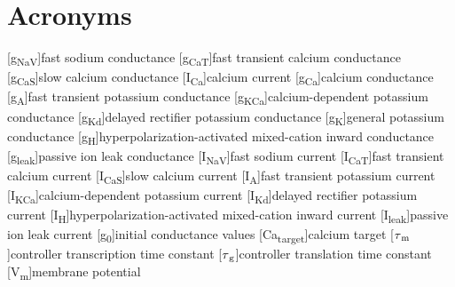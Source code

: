     \chapter*{Acronyms}
    \begin{acronym}[UMLX]
        [g\textsubscript{NaV}]{fast sodium conductance}
    	[g\textsubscript{CaT}]{fast transient calcium conductance}
    	[g\textsubscript{CaS}]{slow calcium conductance}
    	[I\textsubscript{Ca}]{calcium current}
    	[g\textsubscript{Ca}]{calcium conductance}
    	[g\textsubscript{A}]{fast transient potassium conductance}
    	[g\textsubscript{KCa}]{calcium-dependent potassium conductance}
    	[g\textsubscript{Kd}]{delayed rectifier potassium conductance}
    	[g\textsubscript{K}]{general potassium conductance}
    	[g\textsubscript{H}]{hyperpolarization-activated mixed-cation inward conductance}
	    [g\textsubscript{leak}]{passive ion leak conductance}
        [I\textsubscript{NaV}]{fast sodium current}
    	[I\textsubscript{CaT}]{fast transient calcium current}
    	[I\textsubscript{CaS}]{slow calcium current}
    	[I\textsubscript{A}]{fast transient potassium current}
    	[I\textsubscript{KCa}]{calcium-dependent potassium current}
    	[I\textsubscript{Kd}]{delayed rectifier potassium current}
    	[I\textsubscript{H}]{hyperpolarization-activated mixed-cation inward current}
	    [I\textsubscript{leak}]{passive ion leak current}
	    [g\textsubscript{0}]{initial conductance values}
	    [Ca\textsubscript{target}]{calcium target}
	    [$\tau\textsubscript{m}$]{controller transcription time constant}
	    [$\tau\textsubscript{g}$]{controller translation time constant}
	    [V\textsubscript{m}]{membrane potential}
    \end{acronym}

\endgroup
